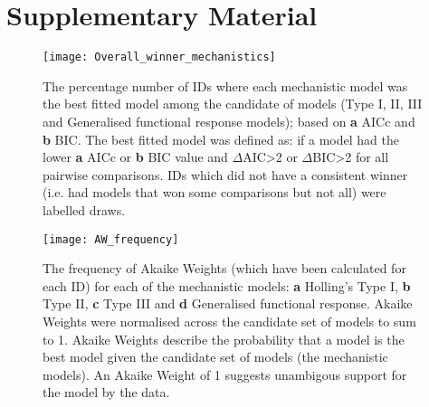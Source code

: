 \documentclass[11pt]{article}
\newcommand{\beginsupplement}{%
        \setcounter{table}{0}
        \renewcommand{\thetable}{S\arabic{table}}%
        \setcounter{figure}{0}
        \renewcommand{\thefigure}{S\arabic{figure}}%
     }
\begin{document}
    \section{Supplementary Material}
    \beginsupplement

    \begin{figure}[htpb]
        \texttt{[image: Overall\_winner\_mechanistics]}\label{fig:2}
        \centering
        \caption{The percentage number of IDs where each mechanistic model was the best fitted model among the candidate of models (Type I, II, III and Generalised functional response models); based on \textbf{a} AICc and \textbf{b} BIC. The best fitted model was defined as: if a model had the lower \textbf{a} AICc or \textbf{b} BIC value and $\Delta$AIC\textgreater2 or $\Delta$BIC\textgreater2 for all pairwise comparisons. IDs which did not have a consistent winner (i.e. had models that won some comparisons but not all) were labelled draws.} 
    \end{figure}    
    
    \begin{figure}[htpb]
        \texttt{[image: AW\_frequency]}\label{fig:4}
        \centering
        \caption{The frequency of Akaike Weights (which have been calculated for each ID) for each of the mechanistic models: \textbf{a} Holling's Type I, \textbf{b} Type II, \textbf{c} Type III and \textbf{d} Generalised functional response. Akaike Weights were normalised across the candidate set of models to sum to 1. Akaike Weights describe the probability that a model is the best model given the candidate set of models (the mechanistic models). An Akaike Weight of 1 suggests unambigous support for the model by the data.}
    \end{figure}

        
\end{document}
